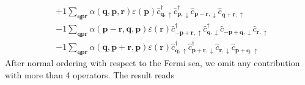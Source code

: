 \begin{align}
	&+1 \sum_{ \mathbf{q} \mathbf{p} \mathbf{r} } \alpha( \mathbf{q}, \mathbf{p}, \mathbf{r} )  \varepsilon( \mathbf{p} )   \hat{c}_{ \mathbf{q}, \uparrow }^\dagger  \hat{c}_{ \mathbf{p}, \downarrow }^\dagger  \hat{c}_{ \mathbf{p}-\mathbf{r}, \downarrow }^{\phantom{\dagger}} \hat{c}_{ \mathbf{q}+\mathbf{r}, \uparrow }^{\phantom{\dagger}}  \\
	&-1 \sum_{ \mathbf{q} \mathbf{p} \mathbf{r} } \alpha( \mathbf{p}-\mathbf{r}, \mathbf{q}, \mathbf{p} )  \varepsilon( \mathbf{r} )   \hat{c}_{ -\mathbf{p}+\mathbf{r}, \uparrow }^\dagger  \hat{c}_{ \mathbf{q}, \downarrow }^\dagger  \hat{c}_{ -\mathbf{p}+\mathbf{q}, \downarrow }^{\phantom{\dagger}} \hat{c}_{ \mathbf{r}, \uparrow }^{\phantom{\dagger}}  \\
	&-1 \sum_{ \mathbf{q} \mathbf{p} \mathbf{r} } \alpha( \mathbf{q}, \mathbf{p}+\mathbf{r}, \mathbf{p} )  \varepsilon( \mathbf{r} )   \hat{c}_{ \mathbf{q}, \uparrow }^\dagger  \hat{c}_{ \mathbf{p}+\mathbf{r}, \downarrow }^\dagger  \hat{c}_{ \mathbf{r}, \downarrow }^{\phantom{\dagger}} \hat{c}_{ \mathbf{p}+\mathbf{q}, \uparrow }^{\phantom{\dagger}} 
\end{align}
After normal ordering with respect to the Fermi sea, we omit any contribution with more than 4 operators. The result reads
